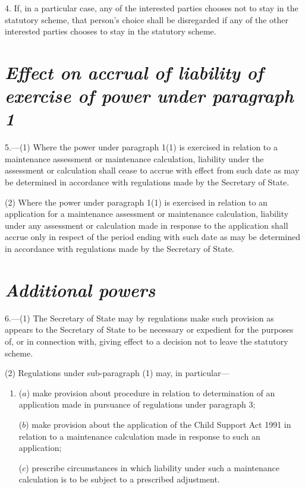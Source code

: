 \documentclass[12pt,a4paper]{article}
\begin{document}

\medskip

4. If, in a particular case, any of the interested parties chooses not to stay in the statutory scheme, that person's choice shall be disregarded if any of the other interested parties chooses to stay in the statutory scheme.

\section*{\itshape Effect on accrual of liability of exercise of power under paragraph 1}

5.---(1) Where the power under paragraph 1(1) is exercised in relation to a maintenance assessment or maintenance calculation, liability under the assessment or calculation shall cease to accrue with effect from such date as may be determined in accordance with regulations made by the Secretary of State.

(2) Where the power under paragraph 1(1) is exercised in relation to an application for a maintenance assessment or maintenance calculation, liability under any assessment or calculation made in response to the application shall accrue only in respect of the period ending with such date as may be determined in accordance with regulations made by the Secretary of State.

\section*{\itshape Additional powers}

6.---(1) The Secretary of State may by regulations make such provision as appears to the Secretary of State to be necessary or expedient for the purposes of, or in connection with, giving effect to a decision not to leave the statutory scheme.

(2) Regulations under sub-paragraph (1) may, in particular—
\begin{enumerate}\item[]
($a$) make provision about procedure in relation to determination of an application made in pursuance of regulations under paragraph 3;

($b$) make provision about the application of the Child Support Act 1991 in relation to a maintenance calculation made in response to such an application;

($c$) prescribe circumstances in which liability under such a maintenance calculation is to be subject to a prescribed adjustment.
\end{enumerate}
\end{document}
